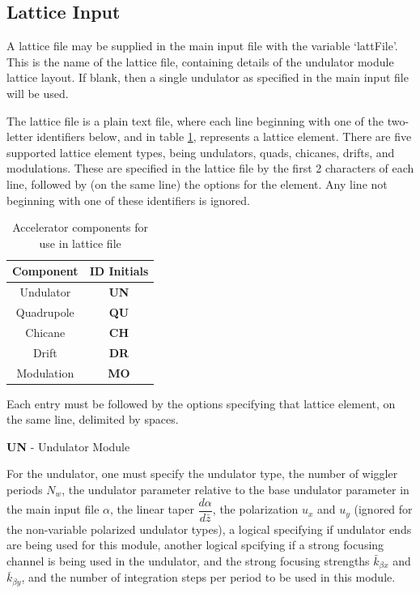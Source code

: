\documentclass[12pt]{article}%
\begin{document}
\subsection{Lattice Input}

\label{latt-file}

A lattice file may be supplied in the main input file with the variable `lattFile'. This is the name of the lattice file, containing details of the undulator module lattice layout. If blank, then a single undulator as specified in the main input file will be used.

The lattice file is a plain text file, where each line beginning with one of the two-letter identifiers below, and in table \ref{tableLat}, represents a lattice element. There are five supported lattice element types, being undulators, quads, chicanes, drifts, and modulations. These are specified in the lattice file by the first 2 characters of each line, followed by (on the same line) the options for the element. Any line not beginning with one of these identifiers is ignored.


\begin{table}
\centering
\caption[Input in Lattice File]{Accelerator components for use in lattice file}
\begin{tabular}{|  c   | c  |}
\hline
Component & ID Initials  \\
\hline
Undulator & {\bf UN} \\
\hline
Quadrupole & {\bf QU} \\
\hline
Chicane & {\bf CH} \\
\hline
Drift & {\bf DR} \\
\hline
Modulation & {\bf MO} \\
\hline
\end{tabular}
\label{tableLat}
\vspace*{-\baselineskip}
\end{table}









Each entry must be followed by the options specifying that lattice element, on the same line, delimited by spaces.

{\bf UN} - Undulator Module

For the undulator,  one must specify the undulator type, the number of wiggler periods $N_w$, the undulator parameter relative to the base undulator parameter in the main input file $\alpha$, the linear taper $\dfrac{d \alpha}{d \bar{z}}$, the polarization $u_x$ and $u_y$ (ignored for the non-variable polarized undulator types), a logical specifying if undulator ends are being used for this module, another logical spcifying if a strong focusing channel is being used in the undulator, and the strong focusing strengths $\bar{k}_{\beta x}$ and $\bar{k}_{\beta y}$, and the number of integration steps per period to be used in this module.
\end{document}
